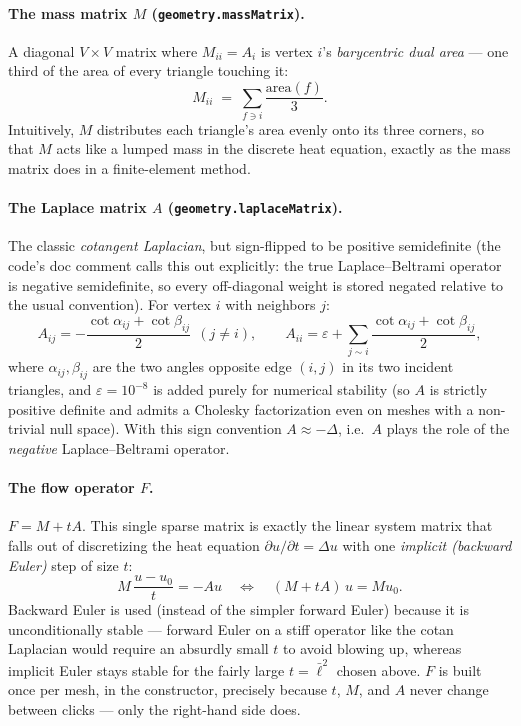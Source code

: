 \documentclass[11pt]{article}
\newcommand{\func}[1]{\texttt{\textbf{#1}}}
\begin{document}
\paragraph{The mass matrix $M$ (\func{geometry.massMatrix}).} A diagonal $V\times V$
matrix where $M_{ii} = A_i$ is vertex $i$'s \emph{barycentric dual area} --- one third of
the area of every triangle touching it:
\[
  M_{ii} \;=\; \sum_{f \ni i} \frac{\mathrm{area}(f)}{3}.
\]
Intuitively, $M$ distributes each triangle's area evenly onto its three corners, so that
$M$ acts like a lumped mass in the discrete heat equation, exactly as the mass matrix does
in a finite-element method.

\paragraph{The Laplace matrix $A$ (\func{geometry.laplaceMatrix}).} The classic
\emph{cotangent Laplacian}, but sign-flipped to be positive semidefinite (the code's doc
comment calls this out explicitly: the true Laplace--Beltrami operator is negative
semidefinite, so every off-diagonal weight is stored negated relative to the usual
convention). For vertex $i$ with neighbors $j$:
\[
  A_{ij} = -\frac{\cot\alpha_{ij}+\cot\beta_{ij}}{2}\ \ (j\ne i),
  \qquad
  A_{ii} = \varepsilon + \sum_{j\sim i}\frac{\cot\alpha_{ij}+\cot\beta_{ij}}{2},
\]
where $\alpha_{ij},\beta_{ij}$ are the two angles opposite edge $(i,j)$ in its two incident
triangles, and $\varepsilon=10^{-8}$ is added purely for numerical stability (so $A$ is
strictly positive definite and admits a Cholesky factorization even on meshes with a
non-trivial null space). With this sign convention $A \approx -\Delta$, i.e.\ $A$ plays the
role of the \emph{negative} Laplace--Beltrami operator.

\paragraph{The flow operator $F$.} $F = M + tA$. This single sparse matrix is exactly the
linear system matrix that falls out of discretizing the heat equation
$\partial u/\partial t=\Delta u$ with one \emph{implicit (backward Euler)} step of size $t$:
\[
  M\,\frac{u-u_0}{t} = -A u
  \quad\Longleftrightarrow\quad
  (M + tA)\,u = M u_0.
\]
Backward Euler is used (instead of the simpler forward Euler) because it is unconditionally
stable --- forward Euler on a stiff operator like the cotan Laplacian would require an
absurdly small $t$ to avoid blowing up, whereas implicit Euler stays stable for the fairly
large $t=\bar\ell^2$ chosen above. $F$ is built once per mesh, in the constructor, precisely
because $t$, $M$, and $A$ never change between clicks --- only the right-hand side does.
\end{document}

